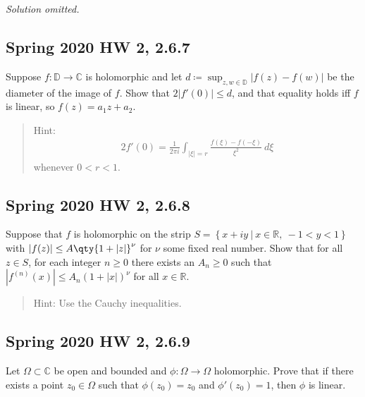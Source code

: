 \emph{Solution omitted.}

\hypertarget{spring-2020-hw-2-2.6.7}{%
\subsection{Spring 2020 HW 2, 2.6.7}\label{spring-2020-hw-2-2.6.7}}

Suppose \(f: {\mathbb{D}}\to {\mathbb{C}}\) is holomorphic and let
\(d \coloneqq\sup_{z, w\in {\mathbb{D}}}{\left\lvert {f(z) - f(w)} \right\rvert}\)
be the diameter of the image of \(f\). Show that
\(2 {\left\lvert {f'(0)} \right\rvert} \leq d\), and that equality holds
iff \(f\) is linear, so \(f(z) = a_1 z + a_2\).

\begin{quote}
Hint:
\begin{align*}
2f'(0) = \frac{1}{2\pi i} \int_{{\left\lvert {\xi } \right\rvert}= r} \frac{ f(\xi) - f(-\xi)  }{\xi^2} ~d\xi
\end{align*}
whenever \(0<r<1\).
\end{quote}

\hypertarget{spring-2020-hw-2-2.6.8}{%
\subsection{Spring 2020 HW 2, 2.6.8}\label{spring-2020-hw-2-2.6.8}}

Suppose that \(f\) is holomorphic on the strip
\(S = \left\{{x+iy {~\mathrel{\Big\vert}~}x\in {\mathbb{R}},~ -1<y<1}\right\}\)
with
\({\left\lvert {f(z)} \right\rvert} \leq A \qty{1 + {\left\lvert {z} \right\rvert}}^\nu\)
for \(\nu\) some fixed real number. Show that for all \(z\in S\), for
each integer \(n\geq 0\) there exists an \(A_n \geq 0\) such that
\({\left\lvert {f^{(n)}(x)} \right\rvert} \leq A_n (1 + {\left\lvert {x} \right\rvert})^\nu\)
for all \(x\in {\mathbb{R}}\).

\begin{quote}
Hint: Use the Cauchy inequalities.
\end{quote}

\hypertarget{spring-2020-hw-2-2.6.9}{%
\subsection{Spring 2020 HW 2, 2.6.9}\label{spring-2020-hw-2-2.6.9}}

Let \(\Omega \subset {\mathbb{C}}\) be open and bounded and
\(\phi: \Omega \to \Omega\) holomorphic. Prove that if there exists a
point \(z_0 \in \Omega\) such that \(\phi(z_0) = z_0\) and
\(\phi'(z_0) = 1\), then \(\phi\) is linear.

